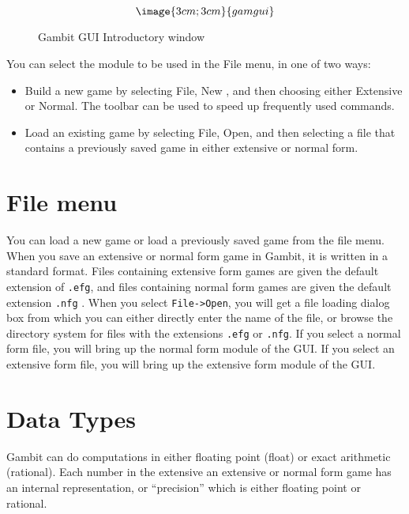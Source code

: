 \begin{figure}
$$\image{3cm;3cm}{gamgui}$$
\caption{Gambit GUI Introductory window}\label{fig_gamgui}
\end{figure}

You can select the module to be used in the File menu,
in one of two ways:
\begin{itemize}
\item Build a new game by selecting File, New , and then choosing either 
Extensive or Normal.  The toolbar can be used to speed up frequently used
commands. 
\item  Load an existing game by selecting File, Open, and then selecting 
a file that contains a previously saved game in either extensive or normal form.
\end{itemize}

\section{File menu}
You can load a new game or load a previously saved game from the file 
menu.  When you save an extensive or normal form game in Gambit, it is 
written in a standard format.  Files containing extensive form games are
given the default extension of \verb+.efg+, and files containing normal
form games are given the default extension \verb+.nfg+ .  When you select 
{\tt File->Open}, you will get a file loading dialog box from which you can
either directly enter the name of the file, or browse the directory system
for files with the extensions \verb+.efg+ or \verb+.nfg+.  If you select a
normal form file, you will bring up the normal form module of the GUI.  If
you select an extensive form file, you will bring up the extensive form
module of the GUI.

\section{Data Types}
Gambit can do computations in either floating point (float) or
exact arithmetic (rational).  Each number in the extensive an extensive 
or normal form game has an internal representation, or ``precision'' which is 
either floating point or rational.  

